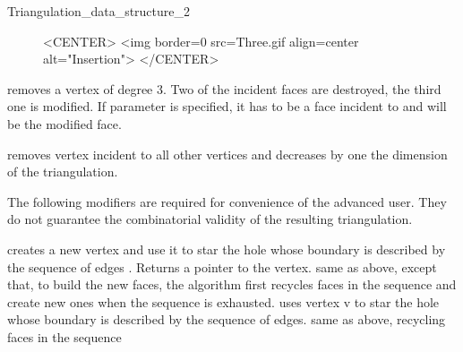 \begin{ccRefConcept}{Triangulation_data_structure_2}
\begin{figure}
\begin{ccHtmlOnly}
<CENTER>
<img border=0 src=Three.gif align=center alt="Insertion">
</CENTER>
\end{ccHtmlOnly} 
\end{figure}



{removes a vertex of degree 3. Two of the incident faces are destroyed,
the third one is modified.
If parameter   is specified, it has to be a face incident to 
and will be the modified face.
}



\ccGlue
{}
\ccGlue
{}
{removes vertex  incident to all other vertices
and  decreases by one the dimension of the triangulation.
 }


\begin{ccAdvanced}
The following modifiers are required for convenience of the advanced
user.
They do not guarantee the combinatorial validity 
of the resulting triangulation.

{creates a new vertex  and use it to star the hole 
whose boundary is described  by the sequence of edges \ccc{[edge_begin, 
edge_end[}. Returns a pointer to the  vertex.}
\ccGlue 
{}
{ same as above, except that, to build the new faces, the  algorithm 
first recycles faces in the sequence \ccc{[face_begin, 
face_end[} and create new ones when the sequence is exhausted.}
\ccGlue
{}
{uses vertex v to  star the hole 
whose boundary is described  by the sequence of edges\ccc{[edge_begin, 
edge_end[}.
}
\ccGlue
{}
{same as above, recycling faces in the sequence  \ccc{[face_begin, 
face_end[ . } }


\end{ccAdvanced}
\end{ccRefConcept}
